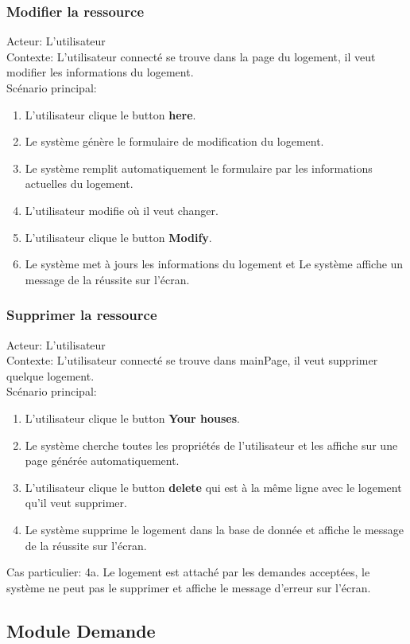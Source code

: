 \documentclass[14px]{article}
\begin{document}
\subsubsection{Modifier la ressource}
Acteur: L'utilisateur\\
Contexte: L'utilisateur connecté se trouve dans la page du logement, il veut modifier les informations du logement.\\
Scénario principal:
\begin{enumerate}
	\item L'utilisateur clique le button \textbf{here}.
	\item Le système génère le formulaire de modification du logement.
	\item Le système remplit automatiquement le formulaire par les informations actuelles du logement.
	\item L'utilisateur modifie où il veut changer.
	\item L'utilisateur clique le button \textbf{Modify}.
	\item Le système met à jours les informations du logement et Le système affiche un message de la réussite sur l'écran.
\end{enumerate}

\subsubsection{Supprimer la ressource}
Acteur: L'utilisateur\\
Contexte: L'utilisateur connecté se trouve dans mainPage, il veut supprimer quelque logement.\\
Scénario principal:
\begin{enumerate}
	\item L'utilisateur clique le button \textbf{Your houses}.
	\item Le système cherche toutes les propriétés de l'utilisateur et les affiche sur une page générée automatiquement.
	\item L'utilisateur clique le button \textbf{delete} qui est à la même ligne avec le logement qu'il veut supprimer.
	\item Le système supprime le logement dans la base de donnée et affiche le message de la réussite sur l'écran.
\end{enumerate}
Cas particulier:
4a. Le logement est attaché par les demandes acceptées, le système ne peut pas le supprimer et affiche le message d'erreur sur l'écran.

\subsection{Module Demande}
\end{document}
